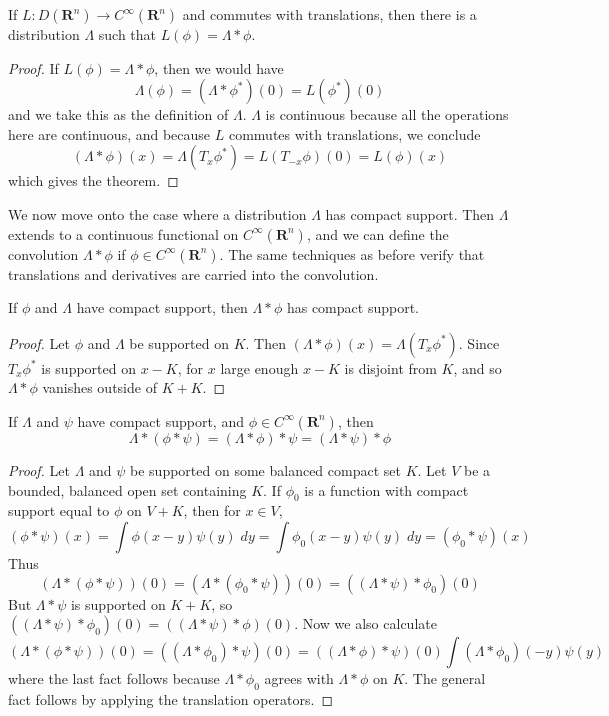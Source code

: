 \begin{theorem}
    If $L: D(\mathbf{R}^n) \to C^\infty(\mathbf{R}^n)$ and commutes with translations, then there is a distribution $\Lambda$ such that $L(\phi) = \Lambda * \phi$.
\end{theorem}
\begin{proof}
    If $L(\phi) = \Lambda * \phi$, then we would have
    \[ \Lambda(\phi) = (\Lambda * \phi^*)(0) = L(\phi^*)(0) \]
    and we take this as the definition of $\Lambda$. $\Lambda$ is continuous because all the operations here are continuous, and because $L$ commutes with translations, we conclude
    \[ (\Lambda * \phi)(x) = \Lambda(T_x \phi^*) = L(T_{-x} \phi)(0) = L(\phi)(x) \]
    which gives the theorem.
\end{proof}

We now move onto the case where a distribution $\Lambda$ has compact support. Then $\Lambda$ extends to a continuous functional on $C^\infty(\mathbf{R}^n)$, and we can define the convolution $\Lambda * \phi$ if $\phi \in C^\infty(\mathbf{R}^n)$. The same techniques as before verify that translations and derivatives are carried into the convolution.

\begin{theorem}
    If $\phi$ and $\Lambda$ have compact support, then $\Lambda * \phi$ has compact support.
\end{theorem}
\begin{proof}
    Let $\phi$ and $\Lambda$ be supported on $K$. Then $(\Lambda * \phi)(x) = \Lambda(T_x \phi^*)$. Since $T_x \phi^*$ is supported on $x - K$, for $x$ large enough $x-K$ is disjoint from $K$, and so $\Lambda * \phi$ vanishes outside of $K + K$.
\end{proof}

\begin{theorem}
    If $\Lambda$ and $\psi$ have compact support, and $\phi \in C^\infty(\mathbf{R}^n)$, then
    \[ \Lambda * (\phi * \psi) = (\Lambda * \phi) * \psi = (\Lambda * \psi) * \phi \]
\end{theorem}
\begin{proof}
    Let $\Lambda$ and $\psi$ be supported on some balanced compact set $K$. Let $V$ be a bounded, balanced open set containing $K$. If $\phi_0$ is a function with compact support equal to $\phi$ on $V + K$, then for $x \in V$,
    \[ (\phi * \psi)(x) = \int \phi(x - y) \psi(y)\; dy = \int \phi_0(x - y) \psi(y)\; dy = (\phi_0 * \psi)(x) \]
    Thus
    \[ (\Lambda * (\phi * \psi))(0) = (\Lambda * (\phi_0 * \psi))(0) = ((\Lambda * \psi) * \phi_0)(0) \]
    But $\Lambda * \psi$ is supported on $K + K$, so $((\Lambda * \psi) * \phi_0)(0) = ((\Lambda * \psi) * \phi)(0)$. Now we also calculate
    \[ (\Lambda * (\phi * \psi))(0) = ((\Lambda * \phi_0) * \psi)(0) = ((\Lambda * \phi) * \psi)(0) \int (\Lambda * \phi_0)(-y) \psi(y) \]
    where the last fact follows because $\Lambda * \phi_0$ agrees with $\Lambda * \phi$ on $K$. The general fact follows by applying the translation operators.
\end{proof}

